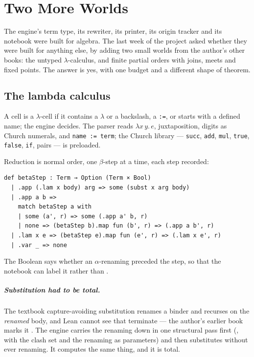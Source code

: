 \chapter{Two More Worlds}\label{ch:worlds}

The engine's term type, its rewriter, its printer, its origin tracker and its notebook were built
for algebra. The last week of the project asked whether they were built for anything else, by
adding two small worlds from the author's other books: the untyped $\lambda$-calculus, and finite
partial orders with joins, meets and fixed points. The answer is yes, with one budget and a
different shape of theorem.

\section{The lambda calculus}

A cell is a $\lambda$-cell if it contains a $\lambda$ or a backslash, a \texttt{:=}, or starts with
a defined name; the engine decides. The parser reads $\lambda x\,y.\,e$, juxtaposition, digits as
Church numerals, and \texttt{name := term}; the Church library --- \texttt{succ}, \texttt{add},
\texttt{mul}, \texttt{true}, \texttt{false}, \texttt{if}, pairs --- is preloaded.

Reduction is normal order, one $\beta$-step at a time, each step recorded:

\begin{verbatim}
def betaStep : Term → Option (Term × Bool)
  | .app (.lam x body) arg => some (subst x arg body)
  | .app a b =>
    match betaStep a with
    | some (a', r) => some (.app a' b, r)
    | none => (betaStep b).map fun (b', r) => (.app a b', r)
  | .lam x e => (betaStep e).map fun (e', r) => (.lam x e', r)
  | .var _ => none
\end{verbatim}

The Boolean says whether an $\alpha$-renaming preceded the step, so that the notebook can label
it  rather than .

\paragraph{Substitution had to be total.} The textbook capture-avoiding substitution renames a
binder and recurses on the \emph{renamed} body, and Lean cannot see that terminate --- the
author's earlier book marks it . The engine carries the renaming down in one
structural pass first (, with the clash set and the renaming as parameters) and then
substitutes without ever renaming. It computes the same thing, and it is total.

